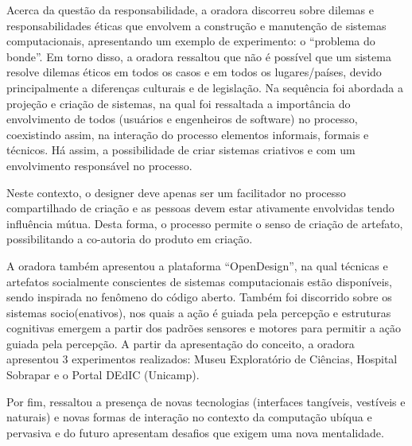 Acerca da questão da responsabilidade, a oradora discorreu sobre dilemas e responsabilidades éticas que envolvem a construção e manutenção de sistemas computacionais, apresentando um exemplo de experimento: o “problema do bonde”. Em torno disso, a oradora ressaltou que não é possível que um sistema resolve dilemas éticos em todos os casos e em todos os lugares/países, devido principalmente a diferenças culturais e de legislação.
Na sequência foi abordada a projeção e criação de sistemas, na qual foi ressaltada a importância do envolvimento de todos (usuários e engenheiros de software) no processo, coexistindo assim, na interação do processo elementos informais, formais e técnicos. Há assim, a possibilidade de criar sistemas criativos e com um envolvimento responsável no processo.

Neste contexto, o designer deve apenas ser um facilitador no processo compartilhado de criação e as pessoas devem estar ativamente envolvidas tendo influência mútua. Desta forma, o processo permite o senso de criação de artefato, possibilitando a co-autoria do produto em criação.

A oradora também apresentou a plataforma “OpenDesign”, na qual técnicas e artefatos socialmente conscientes de sistemas computacionais estão disponíveis, sendo inspirada no fenômeno do código aberto.
Também foi discorrido sobre os sistemas socio(enativos), nos quais a ação é guiada pela percepção e estruturas cognitivas emergem a partir dos padrões sensores e motores para permitir a ação guiada pela percepção. A partir da apresentação do conceito, a oradora apresentou 3 experimentos realizados: Museu Exploratório de Ciências, Hospital Sobrapar e o Portal DEdIC (Unicamp).

Por fim, ressaltou a presença de novas tecnologias (interfaces tangíveis, vestíveis e naturais) e novas formas de interação no contexto da computação ubíqua e pervasiva e do futuro apresentam desafios que exigem uma nova mentalidade.
